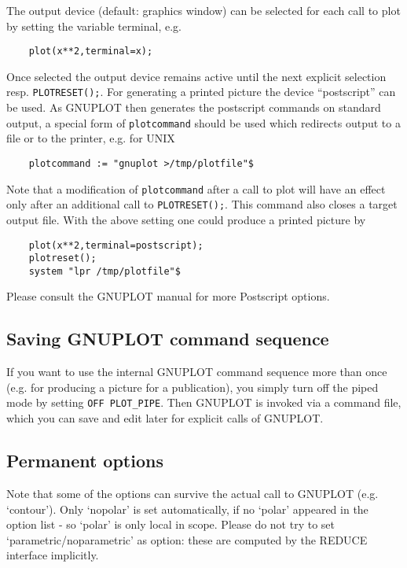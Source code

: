 The output device (default: graphics window) can be selected
for each call to plot by setting the variable terminal, e.g.
\begin{verbatim}
    plot(x**2,terminal=x);
\end{verbatim}
Once selected the output device remains active until the next
explicit selection resp. \verb+PLOTRESET();+. For generating
a printed picture the device ``postscript'' can be used. As
GNUPLOT then generates the postscript commands on standard
output, a special form of \verb+plotcommand+ should be used
which redirects output to a file or to the printer, e.g.
for UNIX 

\begin{verbatim}
    plotcommand := "gnuplot >/tmp/plotfile"$
\end{verbatim}

Note that a modification of \verb+plotcommand+ after a call
to plot will have an effect only after an additional call to
\verb+PLOTRESET();+. This command also closes a target
output file. With the above setting one could 
produce a printed picture by 

\begin{verbatim}
    plot(x**2,terminal=postscript);
    plotreset();
    system "lpr /tmp/plotfile"$
\end{verbatim}

Please consult the GNUPLOT manual for more Postscript options.

\subsection{Saving GNUPLOT command sequence}

If you want to use the internal GNUPLOT command sequence
more than once (e.g. for producing a picture for a publication),
you simply turn off the piped mode by setting \verb+OFF PLOT_PIPE+.
Then GNUPLOT is invoked via a command file, which you can save
and edit later for explicit calls of GNUPLOT.

\subsection{Permanent options}

Note that some of the options can survive the actual call
to GNUPLOT (e.g. `contour'). Only `nopolar' is set automatically,
if no `polar' appeared in the option list - so `polar'
is only local in scope.
Please do not try to set `parametric/noparametric'
as option: these are computed by the {\small REDUCE} interface implicitly.

